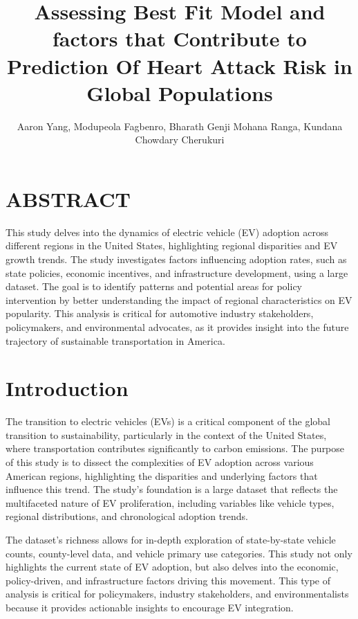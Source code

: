 \documentclass[
  letterpaper,
  DIV=11,
  numbers=noendperiod]{scrartcl}
\title{Assessing Best Fit Model and factors that Contribute to
Prediction Of Heart Attack Risk in Global Populations}
\author{Aaron Yang, Modupeola Fagbenro, Bharath Genji Mohana Ranga,
Kundana Chowdary Cherukuri}
\date{}
\renewcommand*\contentsname{Table of contents}
\newcommand\contentsname{Table of contents}
\begin{document}
\maketitle
\ifdefined\Shaded\renewenvironment{Shaded}{\begin{tcolorbox}[interior hidden, enhanced, borderline west={3pt}{0pt}{shadecolor}, frame hidden, sharp corners, breakable, boxrule=0pt]}{\end{tcolorbox}}\fi

\renewcommand*\contentsname{Table of contents}
{
\hypersetup{linkcolor=}
\setcounter{tocdepth}{3}
\tableofcontents
}
\hypertarget{abstract}{%
\section{ABSTRACT}\label{abstract}}

This study delves into the dynamics of electric vehicle (EV) adoption
across different regions in the United States, highlighting regional
disparities and EV growth trends. The study investigates factors
influencing adoption rates, such as state policies, economic incentives,
and infrastructure development, using a large dataset. The goal is to
identify patterns and potential areas for policy intervention by better
understanding the impact of regional characteristics on EV popularity.
This analysis is critical for automotive industry stakeholders,
policymakers, and environmental advocates, as it provides insight into
the future trajectory of sustainable transportation in America.

\hypertarget{introduction}{%
\section{Introduction}\label{introduction}}

The transition to electric vehicles (EVs) is a critical component of the
global transition to sustainability, particularly in the context of the
United States, where transportation contributes significantly to carbon
emissions. The purpose of this study is to dissect the complexities of
EV adoption across various American regions, highlighting the
disparities and underlying factors that influence this trend. The
study's foundation is a large dataset that reflects the multifaceted
nature of EV proliferation, including variables like vehicle types,
regional distributions, and chronological adoption trends.

The dataset's richness allows for in-depth exploration of state-by-state
vehicle counts, county-level data, and vehicle primary use categories.
This study not only highlights the current state of EV adoption, but
also delves into the economic, policy-driven, and infrastructure factors
driving this movement. This type of analysis is critical for
policymakers, industry stakeholders, and environmentalists because it
provides actionable insights to encourage EV integration.
\end{document}

